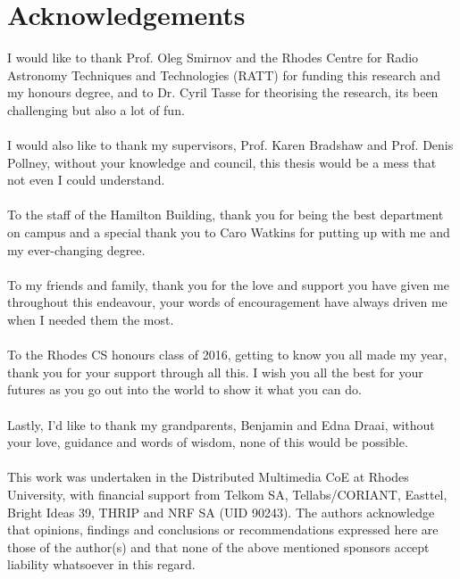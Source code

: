\chapter*{Acknowledgements}
I would like to thank Prof. Oleg Smirnov and the Rhodes Centre for Radio Astronomy Techniques and Technologies (RATT) for funding this research and my honours degree, and to Dr. Cyril Tasse for theorising the research, its been challenging but also a lot of fun.
\\
\\
I would also like to thank my supervisors, Prof. Karen Bradshaw and Prof. Denis Pollney, without your knowledge and council, this thesis would be a mess that not even I could understand.
\\
\\
To the staff of the Hamilton Building, thank you for being the best department on campus and a special thank you to Caro Watkins for putting up with me and my ever-changing degree.
\\
\\
To my friends and family, thank you for the love and support you have given me throughout this endeavour, your words of encouragement have always driven me when I needed them the most.
\\
\\
To the Rhodes CS honours class of 2016, getting to know you all made my year, thank you for your support through all this. I wish you all the best for your futures as you go out into the world to show it what you can do.
\\
\\
Lastly, I'd like to thank my grandparents, Benjamin and Edna Draai, without your love, guidance and words of wisdom, none of this would be possible.
\\
\\
This work was undertaken in the Distributed Multimedia CoE at Rhodes University, with financial support from Telkom SA, Tellabs/CORIANT, Easttel, Bright Ideas 39, THRIP and NRF SA (UID 90243).  The authors acknowledge that opinions, findings and conclusions or recommendations expressed here are those of the author(s) and that none of the above mentioned sponsors accept liability whatsoever in this regard.